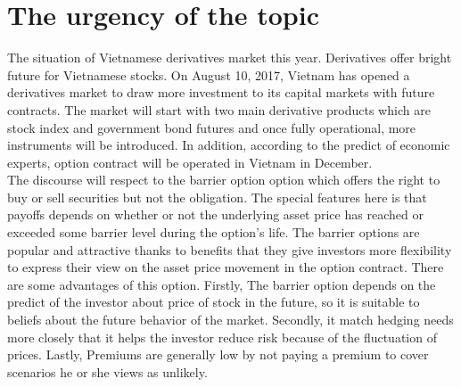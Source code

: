\chapter{The urgency of the topic}
\label{ch:Topic}

 The situation of Vietnamese derivatives market this year. Derivatives offer bright future for Vietnamese stocks. On August 10, 2017, Vietnam has opened a derivatives market to draw more investment to its capital markets with future contracts. The market will start with two main derivative products which are stock index and government bond futures and once fully operational, more instruments will be introduced. In addition, according to the predict of economic experts, option contract will be operated in Vietnam in December.\\ [0.5cm]
The discourse will respect to the barrier option option which offers the right to buy or sell securities but not the obligation.  The special features here is that payoffs  depends on whether or not the underlying asset price has reached or exceeded some barrier level during the option’s life. The barrier options are popular and attractive thanks to benefits that they give investors more flexibility to express their view on the asset price movement in the option contract. There are some advantages of this option. Firstly, The barrier option depends on the predict of the investor about price of stock in the future, so it is suitable to beliefs about the future behavior of the market. Secondly, it match hedging needs more closely that it helps  the investor reduce risk  because of the fluctuation of prices. Lastly, Premiums are generally low  by not paying a premium to cover scenarios he or she views as unlikely. 


 




